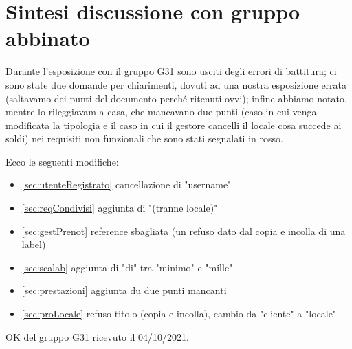\chapter{Sintesi discussione con gruppo abbinato}

Durante l'esposizione con il gruppo G31 sono usciti degli errori di battitura; ci sono state due domande per chiarimenti, 
dovuti ad una nostra esposizione errata (saltavamo dei punti del documento perché ritenuti ovvi); infine abbiamo notato, 
mentre lo rileggiavam a casa, che mancavano due punti (caso in cui venga modificata la tipologia e il caso in cui il gestore 
cancelli il locale cosa succede ai soldi) nei requisiti non funzionali che sono stati segnalati in rosso.

\vspace{0.5cm}

Ecco le seguenti modifiche:
\begin{itemize}
    \item \ref{sec:utenteRegistrato} cancellazione di "username"
    \item \ref{sec:reqCondivisi} aggiunta di "(tranne locale)"
    \item \ref{sec:gestPrenot} reference sbagliata (un refuso dato dal copia e incolla di una label)
    \item \ref{sec:scalab} aggiunta di "di" tra "minimo" e "mille"
    \item \ref{sec:prestazioni} aggiunta du due punti mancanti
    \item \ref{sec:proLocale} refuso titolo (copia e incolla), cambio da "cliente" a "locale"
\end{itemize}

\vspace{1.0cm}

OK del gruppo G31 ricevuto il 04/10/2021.